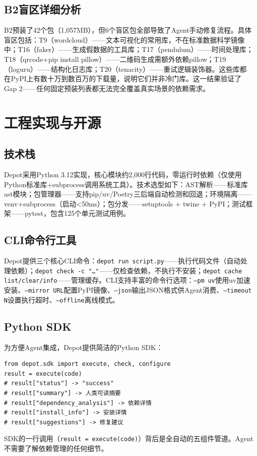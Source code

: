 \documentclass[10pt]{ctexart}
\begin{document}
\subsection{B2盲区详细分析}
B2预装了42个包（1,057MB），但6个盲区包全部导致了Agent手动修复流程。具体盲区包括：T9（wordcloud）——文本可视化的常用库，不在标准数据科学镜像中；T16（faker）——生成假数据的工具库；T17（pendulum）——时间处理库；T18（qrcode+pip install pillow）——二维码生成需额外依赖pillow\cite{pip2024}；T19（loguru）——结构化日志库；T20（tenacity）——重试逻辑装饰器。这些库都在PyPI上有数十万到数百万的下载量\cite{pypi2024}，说明它们并非冷门库。这一结果验证了Gap 2——任何固定预装列表都无法完全覆盖真实场景的依赖需求。

\section{工程实现与开源}

\subsection{技术栈}
Depot采用Python 3.12实现，核心模块约2,000行代码，零运行时依赖（仅使用Python标准库+subprocess调用系统工具）。技术选型如下：AST解析——标准库ast模块\cite{pythonast2024}；包管理器——支持pip\cite{pip2024}/uv\cite{uv2024}/Poetry\cite{poetry2024}三后端自动检测和回退；环境隔离——venv+subprocess\cite{venv2023,subprocess2024}（启动<50ms）；包分发——setuptools\cite{pypa2024setuptools} + twine\cite{pypa2024twine} + PyPI\cite{pypi2024}；测试框架——pytest，包含125个单元测试用例。

\subsection{CLI命令行工具}
Depot提供三个核心CLI命令：\texttt{depot run script.py}——执行代码文件（自动处理依赖）；\texttt{depot check -c "{\ldots}"}——仅检查依赖，不执行不安装；\texttt{depot cache list/clear/info}——管理缓存。CLI支持丰富的命令行选项：\texttt{--pm uv}使用uv加速安装\cite{uv2024}、\texttt{--mirror URL}配置PyPI镜像\cite{pypi2024}、\texttt{--json}输出JSON格式供Agent消费、\texttt{--timeout N}设置执行超时、\texttt{--offline}离线模式。

\subsection{Python SDK}
为方便Agent集成，Depot提供简洁的Python SDK：
\begin{verbatim}
from depot.sdk import execute, check, configure
result = execute(code)
# result["status"] -> "success"
# result["summary"] -> 人类可读摘要
# result["dependency_analysis"] -> 依赖详情
# result["install_info"] -> 安装详情
# result["suggestions"] -> 修复建议
\end{verbatim}
SDK的一行调用（\texttt{result = execute(code)}）背后是全自动的五组件管道。Agent不需要了解依赖管理的任何细节。
\end{document}
